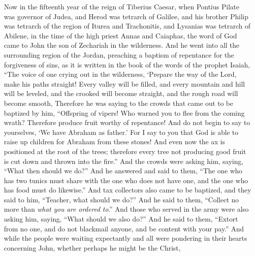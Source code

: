 \begin{biblechapter} %
 Now in the fifteenth year of the reign of Tiberius Caesar, when Pontius Pilate was governor of Judea, and Herod was tetrarch of Galilee, and his brother Philip was tetrarch of the region of Iturea and Trachonitis, and Lysanias was tetrarch of Abilene,
\verse in the time of the high priest Annas and Caiaphas, the word of God came to John the son of Zechariah in the wilderness.
\verse And he went into all the surrounding region of the Jordan, preaching a baptism of repentance for the forgiveness of sins,
\verse as it is written in the book of the words of the prophet Isaiah,
\verse “The voice of one crying out in the wilderness, 
‘Prepare the way of the Lord, 
make his paths straight!
\verse Every valley will be filled, 
and every mountain and hill will be leveled, 
and the crooked will become straight, 
and the rough road will become smooth,
\verse Therefore he was saying to the crowds that came out to be baptized by him, “Offspring of vipers! Who warned you to flee from the coming wrath?
\verse Therefore produce fruit worthy of repentance! And do not begin to say to yourselves, ‘We have Abraham as father.’ For I say to you that God is able to raise up children for Abraham from these stones!
\verse And even now the ax is positioned at the root of the trees; therefore every tree not producing good fruit is cut down and thrown into the fire.”
\verse And the crowds were asking him, saying, “What then should we do?”
\verse And he answered and said to them, “The one who has two tunics must share with the one who does not have one, and the one who has food must do likewise.”
\verse And tax collectors also came to be baptized, and they said to him, “Teacher, what should we do?”
\verse And he said to them, “Collect no more than \textit{what you are ordered to}.”
\verse And those who served in the army were also asking him, saying, “What should we also do?” And he said to them, “Extort from no one, and do not blackmail anyone, and be content with your pay.”
\verse And while the people were waiting expectantly and all were pondering in their hearts concerning John, whether perhaps he might be the Christ,

\end{biblechapter}
